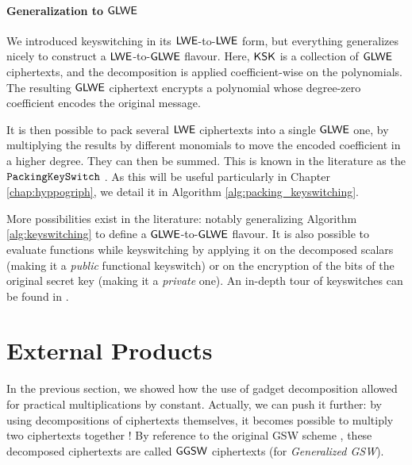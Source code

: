 




\paragraph{Generalization to $\textsf{GLWE}$}


We introduced keyswitching in its $\textsf{LWE}$-to-$\textsf{LWE}$ form, but everything generalizes nicely to construct a $\textsf{LWE}$-to-$\textsf{GLWE}$ flavour. Here, $\textsf{KSK}$ is a collection of $\textsf{GLWE}$ ciphertexts, and the decomposition is applied coefficient-wise on the polynomials. The resulting $\textsf{GLWE}$ ciphertext encrypts a polynomial whose degree-zero coefficient encodes the original message.


It is then possible to pack several $\textsf{LWE}$ ciphertexts into a single $\textsf{GLWE}$ one, by multiplying the results by different monomials to move the encoded coefficient in a higher degree. They can then be summed. This is known in the literature as the $\texttt{PackingKeySwitch}~$. As this will be useful particularly in Chapter \ref{chap:hyppogriph}, we detail it in Algorithm \ref{alg:packing_keyswitching}.




More possibilities exist in the literature: notably generalizing Algorithm \ref{alg:keyswitching} to define a $\textsf{GLWE}$-to-$\textsf{GLWE}$ flavour. It is also possible to evaluate functions while keyswitching by applying it on the decomposed scalars (making it a \textit{public} functional keyswitch) or on the encryption of the bits of the original secret key (making it a \textit{private} one). An in-depth tour of keyswitches can be found in \cite{these_tap}.


\section{External Products}
\label{sec:external_products}

In the previous section, we showed how the use of gadget decomposition allowed for practical multiplications by constant. Actually, we can push it further: by using decompositions of ciphertexts themselves, it becomes possible to multiply two ciphertexts together ! By reference to the original GSW scheme \cite{C:GenSahWat13}, these decomposed ciphertexts are called $\textsf{GGSW}$ ciphertexts (for \textit{Generalized GSW}).


